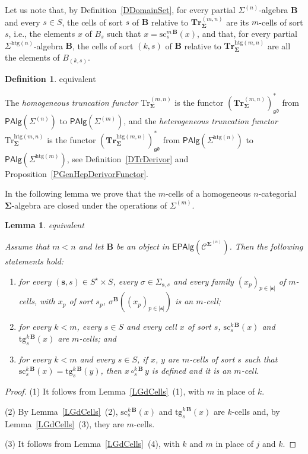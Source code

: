 \documentclass[a4paper, reqno]{amsbook}
\makeatletter
\newcommand{\bb}[1]{\ensuremath{\lvert #1 \rvert}}
\newcommand{\sig}[1]{\mathbf{#1}}             %
\newcommand{\spec}[1]{\boldsymbol{\mathcal{#1}}} %
\newcommand{\gd}{\mathfrak{gd}}              %
\newcommand{\htg}{\mathrm{htg}}                %
\newcommand{\src}{\mathrm{sc}}
\newcommand{\tgt}{\mathrm{tg}}
\newcommand{\Tr}{\mathrm{Tr}}
\newcommand{\bTr}{\mathbf{Tr}}
\theoremstyle{plain}
\newtheorem{lemma}[theorem]{Lemma}
\theoremstyle{definition}
\newtheorem{definition}[theorem]{Definition}
\newcommand*{\CA@leanpending}{}
\newcommand*{\CA@leanrelation}{}
\newcommand*{\lean}[2]{%
  \ifcsname\string\color@lean@#1\endcsname\else
    \PackageError{main}{Unknown relation `#1' in \string\lean}{Use equivalent, weaker or stronger.}%
  \fi
  \gdef\CA@leanrelation{#1}%
  \gdef\CA@leanpending{#2}}
\makeatother
\begin{document}
Let us note that, by Definition~\ref{DDomainSet}, for every partial $\Sigma^{(n)}$-algebra $\mathbf{B}$ and every $s\in S$, the cells of sort $s$ of $\mathbf{B}$ relative to $\bTr^{(m,n)}_{\sig{\Sigma}}$ are its $m$-cells of sort $s$, i.e., the elements $x$ of $B_{s}$ such that $x=\src^{m\,\mathbf{B}}_{s}(x)$, and that, for every partial $\Sigma^{\htg(n)}$-algebra $\mathbf{B}$, the cells of sort $(k,s)$ of $\mathbf{B}$ relative to $\bTr^{\htg(m,n)}_{\sig{\Sigma}}$ are all the elements of $B_{(k,s)}$.

\begin{definition}\label{DTrFunctor}\lean{equivalent}{Dimensions.homogeneousTruncationPartialFunctor,Dimensions.heterogeneousTruncationPartialFunctor}
The \emph{homogeneous truncation functor} $\Tr^{(m,n)}_{\sig{\Sigma}}$ is the functor $(\bTr^{(m,n)}_{\sig{\Sigma}})^{\ast}_{\gd}$ from $\mathsf{PAlg}(\Sigma^{(n)})$ to $\mathsf{PAlg}(\Sigma^{(m)})$, and the \emph{heterogeneous truncation functor} $\Tr^{\htg(m,n)}_{\sig{\Sigma}}$ is the functor $(\bTr^{\htg(m,n)}_{\sig{\Sigma}})^{\ast}_{\gd}$ from $\mathsf{PAlg}(\Sigma^{\htg(n)})$ to $\mathsf{PAlg}(\Sigma^{\htg(m)})$, see Definition~\ref{DTrDerivor} and Proposition~\ref{PGenHepDerivorFunctor}.
\end{definition}

In the following lemma we prove that the $m$-cells of a homogeneous $n$-categorial $\sig{\Sigma}$-algebra are closed under the operations of $\Sigma^{(m)}$.

\begin{lemma}\label{LTrCells}\lean{equivalent}{Dimensions.homogeneousTruncation_transformed}
Assume that $m<n$ and let $\mathbf{B}$ be an object in $\mathsf{EPAlg}(\spec{C}^{\sig{\Sigma}^{(n)}})$.
Then the following statements hold:
\begin{enumerate}
\item for every $(\mathbf{s},s)\in S^{\star}\times S$, every $\sigma\in\Sigma_{\mathbf{s},s}$ and every family $(x_{p})_{p\in\bb{\mathbf{s}}}$ of $m$-cells, with $x_{p}$ of sort $s_{p}$, $\sigma^{\mathbf{B}}((x_{p})_{p\in\bb{\mathbf{s}}})$ is an $m$-cell;
\item for every $k<m$, every $s\in S$ and every cell $x$ of sort $s$, $\src^{k\,\mathbf{B}}_{s}(x)$ and $\tgt^{k\,\mathbf{B}}_{s}(x)$ are $m$-cells; and
\item for every $k<m$ and every $s\in S$, if $x$, $y$ are $m$-cells of sort $s$ such that $\src^{k\,\mathbf{B}}_{s}(x)=\tgt^{k\,\mathbf{B}}_{s}(y)$, then $x\circ^{k\,\mathbf{B}}_{s}y$ is defined and it is an $m$-cell.
\end{enumerate}
\end{lemma}
\begin{proof}
(1) It follows from Lemma~\ref{LGdCells}~(1), with $m$ in place of $k$.

(2) By Lemma~\ref{LGdCells}~(2), $\src^{k\,\mathbf{B}}_{s}(x)$ and $\tgt^{k\,\mathbf{B}}_{s}(x)$ are $k$-cells and, by Lemma~\ref{LGdCells}~(3), they are $m$-cells.

(3) It follows from Lemma~\ref{LGdCells}~(4), with $k$ and $m$ in place of $j$ and $k$.
\end{proof}
\end{document}
